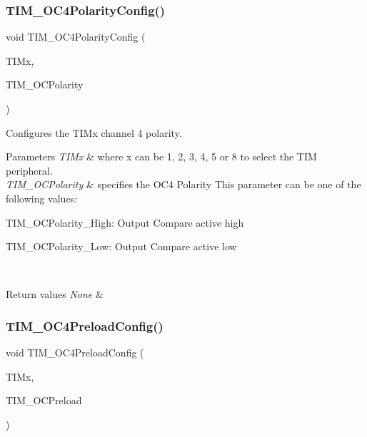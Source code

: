 \subsubsection{\texorpdfstring{TIM\_OC4PolarityConfig()}{TIM\_OC4PolarityConfig()}}
{\footnotesize\ttfamily void T\+I\+M\+\_\+\+O\+C4\+Polarity\+Config (\begin{DoxyParamCaption}\item[{\mbox{\hyperlink{struct_t_i_m___type_def}{T\+I\+M\+\_\+\+Type\+Def}} $\ast$}]{T\+I\+Mx,  }\item[{uint16\+\_\+t}]{T\+I\+M\+\_\+\+O\+C\+Polarity }\end{DoxyParamCaption})}



Configures the T\+I\+Mx channel 4 polarity. 


\begin{DoxyParams}{Parameters}
{\em T\+I\+Mx} & where x can be 1, 2, 3, 4, 5 or 8 to select the T\+IM peripheral. \\
\hline
{\em T\+I\+M\+\_\+\+O\+C\+Polarity} & specifies the O\+C4 Polarity This parameter can be one of the following values\+: \begin{DoxyItemize}
\item T\+I\+M\+\_\+\+O\+C\+Polarity\+\_\+\+High\+: Output Compare active high \item T\+I\+M\+\_\+\+O\+C\+Polarity\+\_\+\+Low\+: Output Compare active low \end{DoxyItemize}
\\
\hline
\end{DoxyParams}

\begin{DoxyRetVals}{Return values}
{\em None} & \\
\hline
\end{DoxyRetVals}
\mbox{\label{group___t_i_m___exported___functions_ga8bf4dfb35ff0c7b494dd96579f50b1ec}} 
\subsubsection{\texorpdfstring{TIM\_OC4PreloadConfig()}{TIM\_OC4PreloadConfig()}}
{\footnotesize\ttfamily void T\+I\+M\+\_\+\+O\+C4\+Preload\+Config (\begin{DoxyParamCaption}\item[{\mbox{\hyperlink{struct_t_i_m___type_def}{T\+I\+M\+\_\+\+Type\+Def}} $\ast$}]{T\+I\+Mx,  }\item[{uint16\+\_\+t}]{T\+I\+M\+\_\+\+O\+C\+Preload }\end{DoxyParamCaption})}



